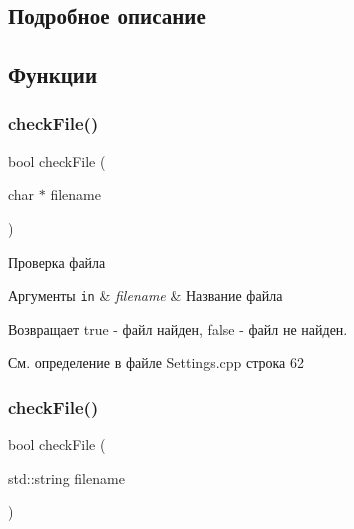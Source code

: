 \subsection{Подробное описание}


\subsection{Функции}
\mbox{\label{group__settingsh_ga2dd1bc039652a0480c444957d416b6a6}} 
\subsubsection{\texorpdfstring{check\+File()}{checkFile()}\hspace{0.1cm}{\footnotesize\ttfamily [1/2]}}
{\footnotesize\ttfamily bool check\+File (\begin{DoxyParamCaption}\item[{char $\ast$}]{filename }\end{DoxyParamCaption})}



Проверка файла 


\begin{DoxyParams}[1]{Аргументы}
\mbox{\tt in}  & {\em filename} & Название файла \\
\hline
\end{DoxyParams}
\begin{DoxyReturn}{Возвращает}
true -\/ файл найден, false -\/ файл не найден. 
\end{DoxyReturn}


См. определение в файле Settings.\+cpp строка 62

\mbox{\label{group__settingsh_ga147bed619c6314e960320c1bcb40ed91}} 
\subsubsection{\texorpdfstring{check\+File()}{checkFile()}\hspace{0.1cm}{\footnotesize\ttfamily [2/2]}}
{\footnotesize\ttfamily bool check\+File (\begin{DoxyParamCaption}\item[{std\+::string}]{filename }\end{DoxyParamCaption})}



